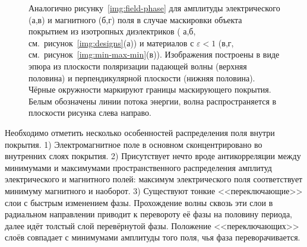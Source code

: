\begin{figure}[p]
  \begin{minipage}[ht]{0.495\linewidth}
  \end{minipage}
  \hfill
  \begin{minipage}[ht]{0.495\linewidth}
  \end{minipage}
  \begin{minipage}[ht]{0.495\linewidth}
  \end{minipage}
  \hfill
  \begin{minipage}[ht]{0.495\linewidth}
  \end{minipage}

  \caption{Аналогично рисунку~\ref{img:field-phase} для амплитуды
    электрического (а,в) и магнитного (б,г) поля в случае маскировки
    объекта покрытием из изотропных диэлектриков ( а,б,
    см.~рисунок~\ref{img:designs}(а)) и материалов с
    ${\varepsilon <1}$ (в,г,
    см.~рисунок~\ref{img:min-max-min}(в)). Изображения построены в
    виде эпюра из плоскости поляризации падающей волны (верхняя
    половина) и перпендикулярной плоскости (нижняя половина). Чёрные
    окружности маркируют границы маскирующего покрытия. Белым
    обозначены линии потока энергии, волна распространяется в
    плоскости рисунка слева направо.}
  \label{img:field-amplitude}
\end{figure}

Необходимо отметить несколько особенностей распределения поля внутри
покрытия. 1) Электромагнитное поле в основном сконцентрировано во
внутренних слоях покрытия. 2) Присутствует нечто вроде антикорреляции
между минимумами и максимумами пространственного распределения
амплитуд электрического и магнитного полей: максимум электрического
поля соответствует минимуму магнитного и наоборот. 3) Существуют
тонкие <<переключающие>> слои с быстрым изменением фазы.  Прохождение
волны сквозь эти слои в радиальном направлении приводит к перевороту
её фазы на половину периода, далее идёт толстый слой перевёрнутой
фазы.  Положение <<переключающих>> слоёв совпадает с минимумами
амплитуды того поля, чья фаза переворачивается.


